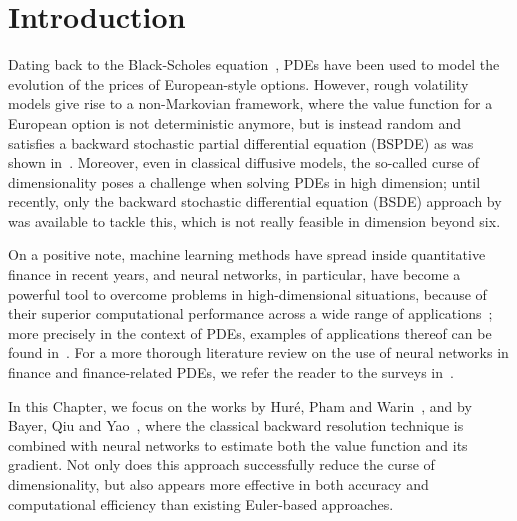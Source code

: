 \section{Introduction}
Dating back to the Black-Scholes equation~\cite{Black1973TheLiabilities}, PDEs have been used to model the evolution of the prices of European-style options. 
However, rough volatility models give rise to a non-Markovian framework, where the value function for a European option is not deterministic anymore, but is instead random and satisfies a backward stochastic partial differential equation (BSPDE) as was shown in~\cite{Bayer2022PricingSPDEs}.
Moreover, even in classical diffusive models, the so-called curse of dimensionality poses a challenge when solving PDEs in high dimension;
until recently, only the backward stochastic differential equation (BSDE) approach by~\cite{Pardoux1990AdaptedEquation} was available to tackle this, 
which is not really feasible in dimension beyond six.

On a positive note, machine learning methods have spread inside quantitative finance in recent years, and neural networks, in particular, have become a powerful tool to overcome problems in high-dimensional situations, because of their superior computational performance across a wide range of applications~\cite{Buehler2019DeepHedging, Gierjatowicz2023RobustEquations, Ruf2020NeuralReview};
more precisely in the context of PDEs, examples of applications thereof can be found in~\cite{E2017DeepEquations, Han2018SolvingLearning, Sirignano2018DGM:Equations, Jacquier2019DeepVolatility, Saporito2021Path-DependentEquations, Beck2021DeepPDEs}. 
For a more thorough literature review on the use of neural networks in finance and finance-related PDEs, we refer the reader to the surveys in~\cite{Beck2023AnEquations, Germain2021NeuralFinance}.

In this Chapter, we focus on the works by Hur{\'e}, Pham and Warin~\cite{Hure2020DeepPDEs}, and by Bayer, Qiu and Yao~\cite{Bayer2022PricingSPDEs}, where the classical backward resolution technique is combined with neural networks to estimate both the value function and its gradient. 
Not only does this approach successfully reduce the curse of dimensionality, but also appears more effective in both accuracy and computational efficiency than existing Euler-based approaches.

